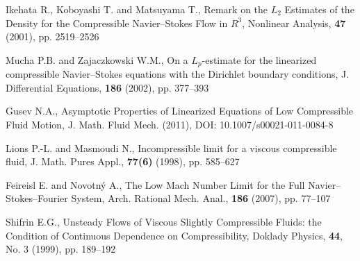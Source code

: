 \documentclass[10pt,a4paper]{article}
\begin{document}
\begin{thebibliography}{6}

Ikehata R., Koboyashi T. and Matsuyama T.,
Remark on the $L_2$ Estimates of the Density for the Compressible
Navier--Stokes Flow in $R^3$,
Nonlinear Analysis, {\bf 47} (2001), pp. 2519--2526

Mucha P.B. and Zajaczkowski W.M.,
On a $L_p$-estimate for the linearized compressible Navier--Stokes
equations with the Dirichlet boundary conditions,
J. Differential Equations, {\bf 186} (2002), pp. 377--393

Gusev N.A.,
Asymptotic Properties of Linearized Equations of Low Compressible Fluid Motion,
J. Math. Fluid Mech. (2011), DOI: 10.1007/s00021-011-0084-8

{Lions P.-L. and Masmoudi N.},
Incompressible limit for a viscous compressible fluid,
J. Math. Pures Appl., {\bf 77(6)} (1998), pp. 585--627

Feireisl E. and Novotn\'{y} A.,
The Low Mach Number Limit for the Full Navier--Stokes--Fourier
System,
Arch. Rational Mech. Anal., {\bf 186} (2007), pp. 77--107

Shifrin E.G.,
Unsteady Flows of Viscous Slightly Compressible Fluids: the
Condition of Continuous Dependence on Compressibility,
Doklady Physics, {\bf 44}, No. 3 (1999), pp. 189--192


\end{thebibliography}
\end{document}
